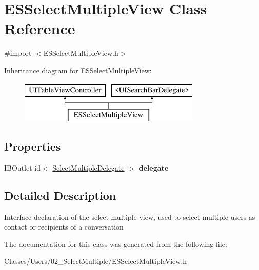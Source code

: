 \hypertarget{interface_e_s_select_multiple_view}{}\section{E\+S\+Select\+Multiple\+View Class Reference}
\label{interface_e_s_select_multiple_view}


{\ttfamily \#import $<$E\+S\+Select\+Multiple\+View.\+h$>$}

Inheritance diagram for E\+S\+Select\+Multiple\+View\+:\begin{figure}[H]
\begin{center}
\leavevmode
\includegraphics[height=2.000000cm]{interface_e_s_select_multiple_view}
\end{center}
\end{figure}
\subsection*{Properties}
\begin{DoxyCompactItemize}
\item 
\hypertarget{interface_e_s_select_multiple_view_a87cd43d0cd4c9a081116075fe9f44f7a}{}I\+B\+Outlet id$<$ \hyperlink{protocol_select_multiple_delegate-p}{Select\+Multiple\+Delegate} $>$ {\bfseries delegate}\label{interface_e_s_select_multiple_view_a87cd43d0cd4c9a081116075fe9f44f7a}

\end{DoxyCompactItemize}


\subsection{Detailed Description}
Interface declaration of the select multiple view, used to select multiple users as contact or recipients of a conversation 

The documentation for this class was generated from the following file\+:\begin{DoxyCompactItemize}
\item 
Classes/\+Users/02\+\_\+\+Select\+Multiple/E\+S\+Select\+Multiple\+View.\+h\end{DoxyCompactItemize}
